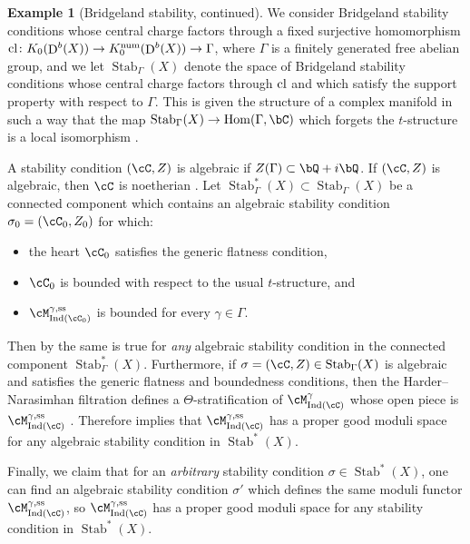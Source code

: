 \documentclass[a4paper]{amsart}
\numberwithin{equation}{section}
\theoremstyle{plain}
\theoremstyle{definition}
\newtheorem{ex}[thm]{Example}
\newcommand{\op}[1]{\!\!\mathop{\rm ~#1}\nolimits}
\DeclareMathOperator{\Hom}{Hom}
\DeclareMathOperator{\D}{D}
\DeclareMathOperator{\Ind}{Ind}
\newcommand{\co}{\colon}
\DeclareMathOperator{\num}{num}
\renewcommand{\ss}{{\rm ss}}
\DeclareMathOperator{\Stab}{Stab}
\begin{document}
\begin{ex} [Bridgeland stability, continued]
We consider Bridgeland stability conditions whose central charge factors through a fixed surjective homomorphism $\op{cl} \co K_0(\D^b(X)) \to K_0^{\num}(\D^b(X)) \to \Gamma$, where $\Gamma$ is a finitely generated free abelian group, and we let $\Stab_\Gamma(X)$ denote the space of Bridgeland stability conditions whose central charge factors through $\op{cl}$ and which satisfy the support property with respect to $\Gamma$. This is given the structure of a complex manifold in such a way that the map $\Stab_\Gamma(X) \to \Hom(\Gamma, \bC)$ which forgets the $t$-structure is a local isomorphism \cite[Thm. 1.2]{bridgeland}.


A stability condition $(\cC,Z)$ is algebraic if $Z(\Gamma) \subset \bQ + i \bQ$. If $(\cC,Z)$ is algebraic, then $\cC$ is noetherian \cite[Prop.~5.0.2]{abramovich2006sheaves}. Let $\Stab_\Gamma^\ast(X) \subset \Stab_\Gamma(X)$ be a connected component which contains an algebraic stability condition $\sigma_0 = (\cC_0, Z_0)$ for which:
\begin{itemize}
\item the heart $\cC_0$ satisfies the generic flatness condition, 
\item $\cC_0$ is bounded with respect to the usual $t$-structure, and
\item $\cM_{\Ind(\cC_0)}^{\gamma,\ss}$ is bounded for every $\gamma \in \Gamma$.
\end{itemize}
Then by \cite[Prop.~4.12]{toda2015moduli} the same is true for \emph{any} algebraic stability condition in the connected component $\Stab_\Gamma^\ast(X)$. Furthermore, if $\sigma = (\cC,Z) \in \Stab_\Gamma(X)$ is algebraic and satisfies the generic flatness and boundedness conditions, then the Harder--Narasimhan filtration defines a $\Theta$-stratification of $\cM_{\Ind(\cC)}^\gamma$ whose open piece is $\cM_{\Ind(\cC)}^{\gamma,\ss}$ \cite[Thm.~6.5.3, Rem.~6.5.6]{hlinstability}. Therefore  implies that $\cM_{\Ind(\cC)}^{\gamma,\ss}$ has a proper good moduli space for any algebraic stability condition in $\Stab^\ast(X)$.

Finally, we claim that for an \emph{arbitrary} stability condition $\sigma \in \Stab^\ast(X)$, one can find an algebraic stability condition $\sigma'$ which defines the same moduli functor $\cM_{\Ind(\cC)}^{\gamma,\ss}$, so $\cM_{\Ind(\cC)}^{\gamma,\ss}$ has a proper good moduli space for any stability condition in $\Stab^\ast(X)$.


\end{ex}
\end{document}
